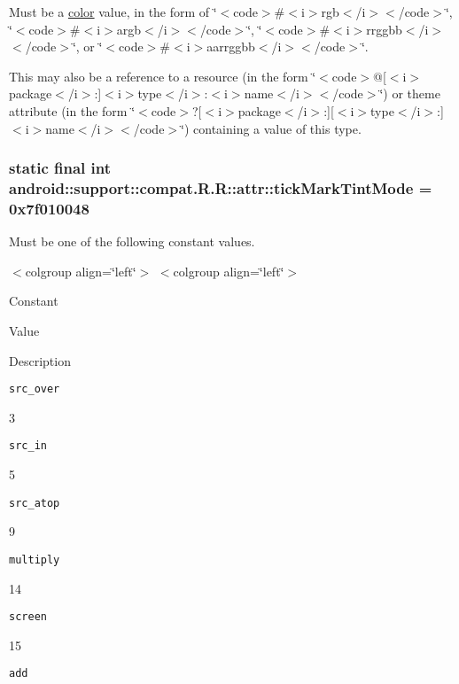 Must be a \hyperlink{classandroid_1_1support_1_1compat_1_1_r_1_1color}{color} value, in the form of \char`\"{}$<$code$>$\#$<$i$>$rgb$<$/i$>$$<$/code$>$\char`\"{}, \char`\"{}$<$code$>$\#$<$i$>$argb$<$/i$>$$<$/code$>$\char`\"{}, \char`\"{}$<$code$>$\#$<$i$>$rrggbb$<$/i$>$$<$/code$>$\char`\"{}, or \char`\"{}$<$code$>$\#$<$i$>$aarrggbb$<$/i$>$$<$/code$>$\char`\"{}. 

This may also be a reference to a resource (in the form \char`\"{}$<$code$>$@\mbox{[}$<$i$>$package$<$/i$>$:\mbox{]}$<$i$>$type$<$/i$>$:$<$i$>$name$<$/i$>$$<$/code$>$\char`\"{}) or theme attribute (in the form \char`\"{}$<$code$>$?\mbox{[}$<$i$>$package$<$/i$>$:\mbox{]}\mbox{[}$<$i$>$type$<$/i$>$:\mbox{]}$<$i$>$name$<$/i$>$$<$/code$>$\char`\"{}) containing a value of this type. \hypertarget{classandroid_1_1support_1_1compat_1_1_r_1_1attr_82fd1d13d7a9db00e9a5d374267ca7af}{
\subsubsection[{tickMarkTintMode}]{\setlength{\rightskip}{0pt plus 5cm}static final int android::support::compat.R.R::attr::tickMarkTintMode = 0x7f010048}}
\label{classandroid_1_1support_1_1compat_1_1_r_1_1attr_82fd1d13d7a9db00e9a5d374267ca7af}


Must be one of the following constant values. \begin{TabularC}{0}
\hline
\end{TabularC}
$<$colgroup align=\char`\"{}left\char`\"{}$>$ $<$colgroup align=\char`\"{}left\char`\"{}$>$ 

Constant

Value

Description 

{\tt src\_\-over}

3

{\tt src\_\-in}

5

{\tt src\_\-atop}

9

{\tt multiply}

14

{\tt screen}

15

{\tt add}

